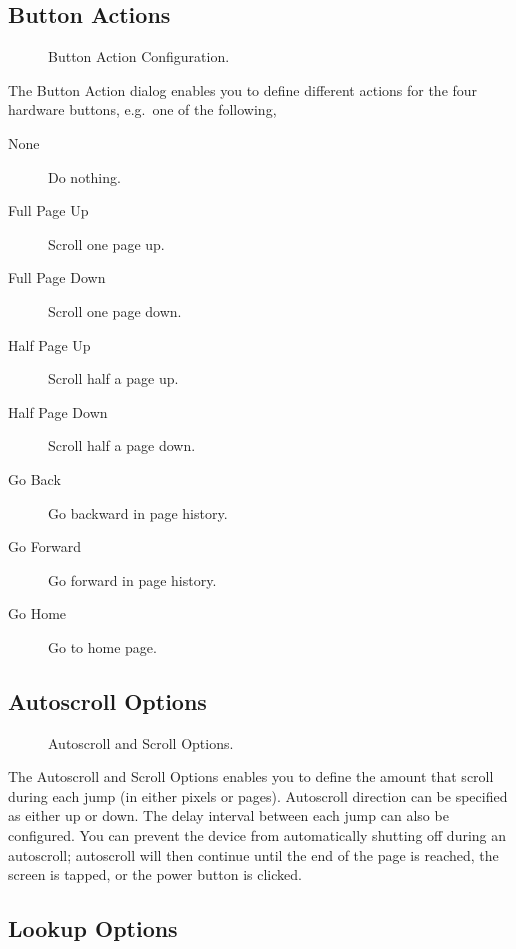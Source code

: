 \subsection{Button Actions}\label{sec:HWButtons}

\begin{figure} [!htb]
\centerline{}
\caption{\label{fig:HWButtons}Button Action Configuration.}
\end{figure}

The Button Action dialog enables you to define different actions for the
four hardware buttons, e.g.\ one of the following,

\begin{description}
  \item[None] Do nothing.
  \item[Full Page Up] Scroll one page up.
  \item[Full Page Down] Scroll one page down.
  \item[Half Page Up] Scroll half a page up.
  \item[Half Page Down] Scroll half a page down.
  \item[Go Back] Go backward in page history.
  \item[Go Forward] Go forward in page history.
  \item[Go Home] Go to home page.
\end{description}

\subsection{Autoscroll Options}\label{sec:Autoscroll}

\begin{figure} [!htb]
\centerline{}
\caption{\label{fig:Autoscroll}Autoscroll and Scroll Options.}
\end{figure}

The Autoscroll and Scroll Options enables you to define the amount that
scroll during each jump (in either pixels or pages). Autoscroll direction
can be specified as either up or down. The delay interval between each
jump can also be configured. You can prevent the device from automatically
shutting off during an autoscroll; autoscroll will then continue until the
end of the page is reached, the screen is tapped, or the power button is
clicked.

\subsection{Lookup Options}\label{sec:Lookup}

